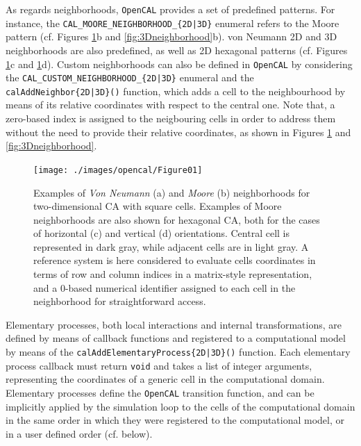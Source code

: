  As regards neighborhoods, \texttt{OpenCAL} provides a set of predefined
patterns. For instance, the \verb'CAL_MOORE_NEIGHBORHOOD_{2D|3D}'
enumeral refers to the Moore pattern (cf. Figures
\ref{fig:2Dneighborhood}b and \ref{fig:3Dneighborhood}b). von
Neumann 2D and 3D neighborhoods are also predefined, as well as 2D
hexagonal patterns (cf. Figures \ref{fig:2Dneighborhood}c and
\ref{fig:2Dneighborhood}d). Custom neighborhoods can also be defined
in \texttt{OpenCAL} by considering the \verb'CAL_CUSTOM_NEIGHBORHOOD_{2D|3D}'
enumeral and the \verb'calAddNeighbor{2D|3D}()' function, which adds
a cell to the neighbourhood by means of its relative coordinates
with respect to the central one. Note that, a zero-based index is
assigned to the neigbouring cells in order to address them without
the need to provide their relative coordinates, as shown in Figures
\ref{fig:2Dneighborhood} and \ref{fig:3Dneighborhood}.
\begin{figure}[!htbp]
	\begin{center}
		\texttt{[image: ./images/opencal/Figure01]}
		\caption[Examples of \textit{Von Neumann} and \textit{Moore} neighborhoods.]{Examples of \textit{Von Neumann} (a) and \textit{Moore} (b) neighborhoods for two-dimensional CA with square cells. Examples of Moore neighborhoods are also shown for hexagonal CA, both for the cases of horizontal (c) and vertical (d) orientations. Central cell is represented in dark gray, while adjacent cells are in light gray. A reference system is here considered to evaluate cells coordinates in terms of row and column indices in a matrix-style representation, and a $0$-based numerical identifier assigned to each cell in the neighborhood for straightforward access.}
		\label{fig:2Dneighborhood}
	\end{center}
\end{figure}
Elementary processes, both local interactions and internal
transformations, are defined by means of callback functions and
registered to a computational model by means of the
\verb'calAddElementaryProcess{2D|3D}()' function. Each elementary
process callback must return \verb'void' and takes a list of integer
arguments, representing the coordinates of a generic cell in the
computational domain. Elementary processes define the \texttt{OpenCAL}
transition function, and can be implicitly applied by the simulation
loop to the cells of the computational domain in the same order in
which they were registered to the computational model, or in a user
defined order (cf. below).


